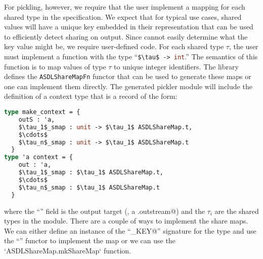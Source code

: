 For pickling, however, we require that the user implement a mapping for
each shared type in the specification.
We expect that for typical use cases, shared values will have a unique key
embedded in their representation that can be used to efficiently detect sharing on
output.
Since \asdlgen{} cannot easily determine what the key value might be, we
require user-defined code.
For each shared type $\tau$, the user must implement a function with the
type ``\lstinline[language=sml,mathescape=true]@$\tau$ -> int@.''
The semantics of this function is to map values of type $\tau$ to unique integer
identifiers.
The \asdl{} library defines the \lstinline[language=sml]@ASDLShareMapFn@ functor
that can be used to generate these maps or one can implement them directly.
The generated pickler module will include the definition of a context type
that is a record of the form:
\begin{code}
\begin{lstlisting}[language=sml,mathescape=true]
type make_context = {
    outS : 'a,
    $\tau_1$_smap : unit -> $\tau_1$ ASDLShareMap.t,
    $\cdots$
    $\tau_n$_smap : unit -> $\tau_1$ ASDLShareMap.t
  }
type 'a context = {
    out : 'a,
    $\tau_1$_smap : $\tau_1$ ASDLShareMap.t,
    $\cdots$
    $\tau_n$_smap : $\tau_1$ ASDLShareMap.t
  }
\end{lstlisting}%
\end{code}%
where the ``\lstinline@outS@'' field is the output target (\eg{}, a
\lstinline@TextIO.outstream@) and the $\tau_i$ are the shared types
in the module.
There are a couple of ways to implement the share maps.  We can either
define an instance of the ``\lstinline@HASH_KEY@'' signature for the type
and use the ``\lstinline@ASDLShareMapFn@'' functor to implement the map
or we can use the `ASDLShareMap.mkShareMap` function.


